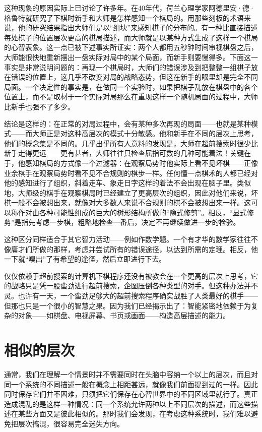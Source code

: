 这种现象的原因实际上已讨论了许多年。在40年代，荷兰心理学家阿德里安·德·格鲁特就研究了下棋时新手和大师是怎样感知一个棋局的。用那些刻板的术语来说，他的研究结果指出大师们是以“组块”来感知棋子的分布的。有一种比直接描述每处棋子的位置层次更高的棋局描述，而大师就是以某种方式生成了这样一个棋局的心智表象。这一点已被下述事实所证实：两个人都用五秒钟时间审视棋盘之后，大师能很快地重新摆出一盘实际对局中的某个局面，而新手则要慢得多。下面这一事实是非常说明问题的：再现一个棋局时，大师们的错误涉及到把整整一组棋子放在错误的位置上，这几乎不改变对局的战略态势，但这在新手的眼里却是完全不同局面。一个决定性的事实是，在做同一个实验时，如果把棋子乱放在棋盘中的各个位置上，而不是取材于一个实际对局那么在重现这样一个随机局面的过程中，大师比新手也强不了多少。

结论是这样的：在正常的对局过程中，会有某种多次再现的局面——也就是某种模式——而大师正是对这种高层次的模式十分敏感。他和新手在不同的层次上思考，他们的概念集是不同的。几乎出乎所有人意料的发现是，大师在超前搜索时很少比新手走得更远——更有甚者，大师往往只检查屈指可数的几种可能着法！关键在于，他感知棋局的方式像一个过滤器：在观察局势时他实际上看不见坏棋——正像业余棋手在观察局势时看不见不合规则的棋步一样。任何懂一点棋术的人都已经对他的感知进行了组织，斜着走车、象走日字这样的着法不会出现在脑子里。类似地，大师级的棋手在观察棋局时已经建立了更高层次的组织，因此对他们来说，坏棋一般不会被想出来，就像对大多数人来说不合规则的棋不会被想出来一样。这可以称作对由各种可能性组成的巨大的树形结构所做的“隐式修剪”。相反，“显式修剪”是指先考虑一步棋，粗略地检查一番后，决定不再继续做进一步的检验。

这种区分同样适合于其它智力活动——例如作数学题。一个有才华的数学家往往不像庸才们所做的那样，考虑并尝试所有的错误途径，以达到所需的定理。相反，他一下就“嗅出”了有希望的途径，然后立即进行下去。

仅仅依赖于超前搜索的计算机下棋程序还没有被教会在一个更高的层次上思考，它的战略只是凭一股蛮劲进行超前搜索，企图压倒各种类型的对手。但这种办法并不灵。也许有一天，一个蛮劲足够大的超前搜索程序确实战胜了人类最好的棋手——但那也只是一个很小的智慧之果。因为我们已经揭示出了：智能紧密地依赖于为复杂的对象——如棋盘、电视屏幕、书页或画面——构造高层描述的能力。

\section{相似的层次}

通常，我们在理解一个情景时并不需要同时在头脑中容纳一个以上的层次，而且对同一个系统的不同描述一般在概念上相距甚远，就像我们前面提到过的一样。因此同时保存它们并不困难，只须把它们保存在心智世界中的不同区域里就行了。真正造成混乱的是这样一种情况：同一个系统允许两种以上不同层次的描述，而这些描述在某些方面又是彼此相似的。那时我们会发现，在考虑这种系统时，我们难以避免把层次搞混，很容易完全迷失方向。

